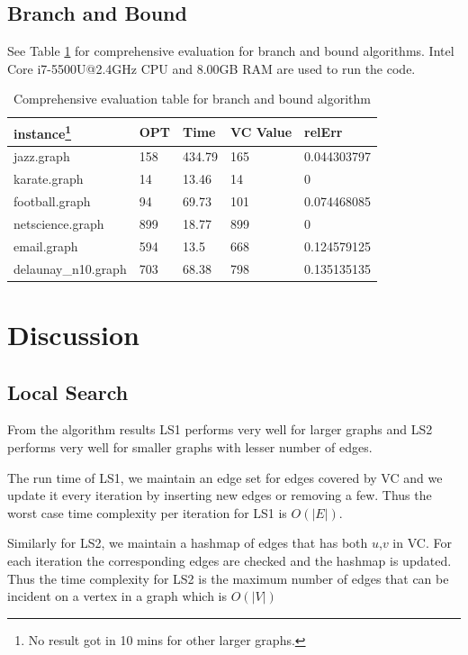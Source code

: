 \subsection{Branch and Bound}
See Table \ref{tab3} for comprehensive evaluation for branch and bound algorithms. Intel Core i7-5500U@2.4GHz CPU and 8.00GB RAM are used to run the code.
\begin{table}[htb]
\caption{Comprehensive evaluation table for branch and bound algorithm}
\label{tab3}
\begin{minipage}{\columnwidth}
\begin{center}
\begin{tabular}{@{}lllll@{}}
\toprule
instance\footnote{No result got in 10 mins for other larger graphs.} & OPT & Time   & VC Value & relErr      \\ \midrule
jazz.graph          & 158 & 434.79 & 165      & 0.044303797 \\
karate.graph        & 14  & 13.46  & 14       & 0           \\
football.graph      & 94  & 69.73  & 101      & 0.074468085 \\
netscience.graph    & 899 & 18.77  & 899      & 0           \\
email.graph         & 594 & 13.5   & 668      & 0.124579125 \\
delaunay\_n10.graph & 703 & 68.38  & 798      & 0.135135135 \\ \bottomrule
\end{tabular}
\end{center}
\end{minipage}
\end{table}

\section{Discussion}
\subsection{Local Search}
From the algorithm results LS1 performs very well for larger graphs and LS2 performs very well for smaller graphs with lesser number of edges.

The run time of LS1, we maintain an edge set for edges covered by VC and we update it every iteration by inserting new edges or removing a few. Thus the worst case time complexity per iteration for LS1 is $O(|E|)$.

Similarly for LS2, we maintain a hashmap of edges that has both $u$,$v$  in VC. For each iteration the corresponding edges are checked and the hashmap is updated. Thus the time complexity for LS2 is the maximum number of edges that can be incident on a vertex in a graph which is $O(|V|)$

